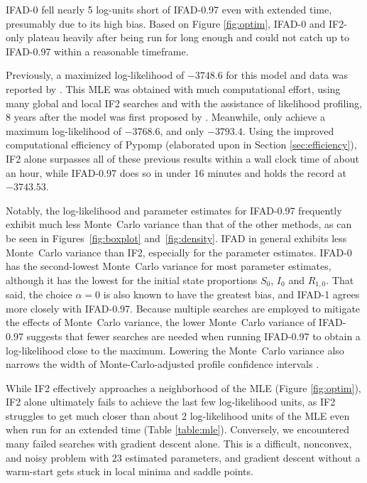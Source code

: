 \documentclass[numsec,webpdf,modern,medium,namedate]{oup-authoring-template}
\begin{document}
 
IFAD-0 fell nearly 5 log-units short of IFAD-0.97 even with extended time, presumably due to its high bias. 
Based on Figure \ref{fig:optim}, IFAD-0 and IF2-only plateau heavily after being run for long enough and could not catch up to IFAD-0.97 within a reasonable timeframe.

Previously, a maximized log-likelihood of $-3748.6$ for this model and data was reported by \cite{king16}.
This MLE was obtained with much computational effort, using many global and local IF2 searches and with the assistance of likelihood profiling, 8 years after the model was first proposed by \cite{king08}.
Meanwhile, \cite{ionides15} only achieve a maximum log-likelihood of $-3768.6$, and \cite{king08} only $-3793.4$.
Using the improved computational efficiency of Pypomp (elaborated upon in Section \ref{sec:efficiency}), IF2 alone surpasses all of these previous results within a wall clock time of about an hour, while IFAD-0.97 does so in under 16 minutes and holds the record at $-3743.53$.


Notably, the log-likelihood and parameter estimates for IFAD-0.97 frequently exhibit much less Monte~Carlo variance than that of the other methods, as can be seen in Figures~\ref{fig:boxplot} and~\ref{fig:density}. 
IFAD in general exhibits less Monte~Carlo variance than IF2, especially for the parameter estimates. 
IFAD-0 has the second-lowest Monte~Carlo variance for most parameter estimates, although it has the lowest for the initial state proportions $S_0$, $I_0$ and $R_{1,0}$.
That said, the choice $\alpha=0$ is also known to have the greatest bias, and IFAD-1 agrees more closely with IFAD-0.97. 
Because multiple searches are employed to mitigate the effects of Monte~Carlo variance, the lower Monte~Carlo variance of IFAD-0.97 suggests that fewer searches are needed when running IFAD-0.97 to obtain a log-likelihood close to the maximum. 
Lowering the Monte~Carlo variance also narrows the width of Monte-Carlo-adjusted profile confidence intervals \citep{ionides17}.


While IF2 effectively approaches a neighborhood of the MLE (Figure \ref{fig:optim}), IF2 alone ultimately fails to achieve the last few log-likelihood units, as IF2 struggles to get much closer than about 2 log-likelihood units of the MLE even when run for an extended time (Table \ref{table:mle}).
Conversely, we encountered many failed searches with gradient descent alone. 
This is a difficult, nonconvex, and noisy problem with $23$ estimated parameters, and gradient descent without a warm-start gets stuck in local minima and saddle points.
\end{document}
